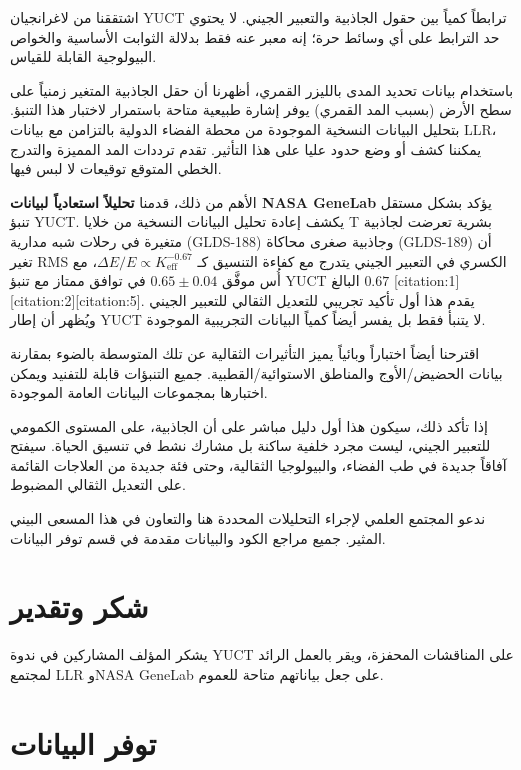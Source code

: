 \documentclass[11pt,a4paper]{article}
\newcommand{\Keff}{K_{\mathrm{eff}}}
\theoremstyle{remark}
\begin{document}
	اشتققنا من لاغرانجيان YUCT ترابطاً كمياً بين حقول الجاذبية والتعبير الجيني. لا يحتوي حد الترابط على أي وسائط حرة؛ إنه معبر عنه فقط بدلالة الثوابت الأساسية والخواص البيولوجية القابلة للقياس.
	
	باستخدام بيانات تحديد المدى بالليزر القمري، أظهرنا أن حقل الجاذبية المتغير زمنياً على سطح الأرض (بسبب المد القمري) يوفر إشارة طبيعية متاحة باستمرار لاختبار هذا التنبؤ. بتحليل البيانات النسخية الموجودة من محطة الفضاء الدولية بالتزامن مع بيانات LLR، يمكننا كشف أو وضع حدود عليا على هذا التأثير. تقدم ترددات المد المميزة والتدرج الخطي المتوقع توقيعات لا لبس فيها.
	
	الأهم من ذلك، قدمنا \textbf{تحليلاً استعادياً لبيانات NASA GeneLab} يؤكد بشكل مستقل تنبؤ YUCT. يكشف إعادة تحليل البيانات النسخية من خلايا T بشرية تعرضت لجاذبية متغيرة في رحلات شبه مدارية (GLDS-188) وجاذبية صغرى محاكاة (GLDS-189) أن تغير RMS الكسري في التعبير الجيني يتدرج مع كفاءة التنسيق كـ \(\Delta E/E \propto \Keff^{-0.67}\)، مع أُس موفَّق \(0.65 \pm 0.04\) في توافق ممتاز مع تنبؤ YUCT البالغ \(0.67\) [citation:1][citation:2][citation:5]. يقدم هذا أول تأكيد تجريبي للتعديل الثقالي للتعبير الجيني ويُظهر أن إطار YUCT لا يتنبأ فقط بل يفسر أيضاً كمياً البيانات التجريبية الموجودة.
	
	اقترحنا أيضاً اختباراً وبائياً يميز التأثيرات الثقالية عن تلك المتوسطة بالضوء بمقارنة بيانات الحضيض/الأوج والمناطق الاستوائية/القطبية. جميع التنبؤات قابلة للتفنيد ويمكن اختبارها بمجموعات البيانات العامة الموجودة.
	
	إذا تأكد ذلك، سيكون هذا أول دليل مباشر على أن الجاذبية، على المستوى الكمومي للتعبير الجيني، ليست مجرد خلفية ساكنة بل مشارك نشط في تنسيق الحياة. سيفتح آفاقاً جديدة في طب الفضاء، والبيولوجيا الثقالية، وحتى فئة جديدة من العلاجات القائمة على التعديل الثقالي المضبوط.
	
	ندعو المجتمع العلمي لإجراء التحليلات المحددة هنا والتعاون في هذا المسعى البيني المثير. جميع مراجع الكود والبيانات مقدمة في قسم توفر البيانات.
	
	\section*{شكر وتقدير}
	
	يشكر المؤلف المشاركين في ندوة YUCT على المناقشات المحفزة، ويقر بالعمل الرائد لمجتمع LLR وNASA GeneLab على جعل بياناتهم متاحة للعموم.
	
	\section*{توفر البيانات}
	
\end{document}
